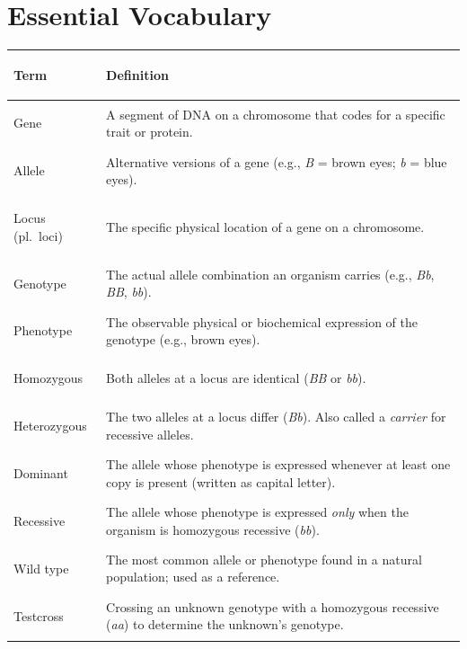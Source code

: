 \documentclass[11pt, letterpaper]{article}
\begin{document}
\vspace{8pt}

\section*{Essential Vocabulary}

\noindent
{\renewcommand{\arraystretch}{1.5}
\begin{tabularx}{\textwidth}{>{\bfseries\raggedright\arraybackslash}p{3.5cm}
                              >{\raggedright\arraybackslash}X}
\toprule
\rowcolor{tableheaderpurple}
\textbf{Term} & \textbf{Definition} \\
\midrule
\rowcolor{rowPu} Gene            & A segment of DNA on a chromosome that codes for a specific trait or protein. \\
\rowcolor{rowA}  Allele          & Alternative versions of a gene (e.g., \textit{B} = brown eyes; \textit{b} = blue eyes). \\
\rowcolor{rowPu} Locus (pl.\ loci)& The specific physical location of a gene on a chromosome. \\
\rowcolor{rowA}  Genotype        & The actual allele combination an organism carries (e.g., \textit{Bb}, \textit{BB}, \textit{bb}). \\
\rowcolor{rowPu} Phenotype       & The observable physical or biochemical expression of the genotype (e.g., brown eyes). \\
\rowcolor{rowA}  Homozygous      & Both alleles at a locus are identical (\textit{BB} or \textit{bb}). \\
\rowcolor{rowPu} Heterozygous    & The two alleles at a locus differ (\textit{Bb}). Also called a \emph{carrier} for recessive alleles. \\
\rowcolor{rowA}  Dominant        & The allele whose phenotype is expressed whenever at least one copy is present (written as capital letter). \\
\rowcolor{rowPu} Recessive       & The allele whose phenotype is expressed \emph{only} when the organism is homozygous recessive (\textit{bb}). \\
\rowcolor{rowA}  Wild type       & The most common allele or phenotype found in a natural population; used as a reference. \\
\rowcolor{rowPu} Testcross       & Crossing an unknown genotype with a homozygous recessive (\textit{aa}) to determine the unknown's genotype. \\
\bottomrule
\end{tabularx}}
\end{document}
